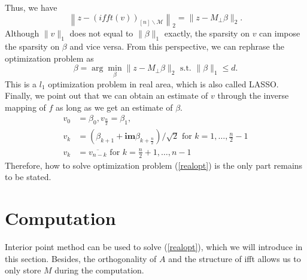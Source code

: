 \documentclass[final,onefignum,onetabnum]{siamart190516}
\begin{document}
Thus, we have
\begin{equation}
    \left\|z - \left(ifft(v)\right)_{[n]\backslash\mathcal{M}}\right\|_2 = \|z-M_{\perp}\beta\|_2.
\end{equation}
Although $\|v\|_1$ does not equal to $\|\beta\|_1$ exactly, the sparsity on $v$ can impose the sparsity on $\beta$ and vice versa. From this perspective, we can rephrase the optimization problem as
\begin{equation}\label{realopt}
    \beta = \arg\min_{\beta}\|z-M_{\perp}\beta\|_2\text{ s.t. }\|\beta\|_1\leq d.
\end{equation}
This is a $l_1$ optimization problem in real area, which is also called LASSO. Finally, we point out that we can obtain an estimate of $v$ through the inverse mapping of $f$ as long as we get an estimate of $\beta$.
\begin{equation}
\begin{aligned}
    v_0 &= \beta_0, v_{\frac{n}{2}} = \beta_1, \\
    v_k &= (\beta_{k+1}+\textbf{im}\beta_{k+\frac{n}{2}})/\sqrt{2}\text{ for }k=1,\dots,\frac{n}{2}-1\\
    v_{k} &= \overline{v_{n-k}}\text{ for }k=\frac{n}{2}+1,\dots,n-1
\end{aligned}
\end{equation}
Therefore, how to solve optimization problem (\ref{realopt}) is the only part remains to be stated.

\section{Computation}
Interior point method can be used to solve (\ref{realopt}), which we will introduce in this section. Besides, the orthogonality of $A$ and the structure of ifft allows us to only store $M$ during the computation. 
\end{document}
